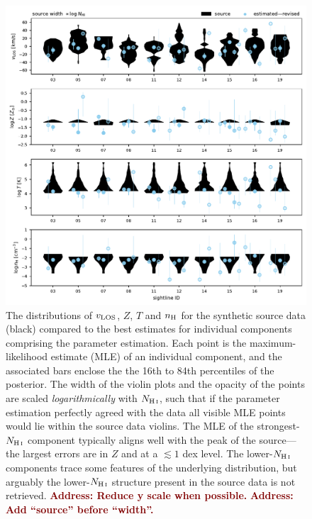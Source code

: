 \documentclass[fleqn,usenatbib]{mnras}
\newcommand{\todo}[1]{\textcolor{Maroon}{\textbf{Address: #1}}}
\begin{document}
\begin{figure}
    \centering
    \includegraphics[width=\textwidth]{figures/sample2/violin_vs_components_revised.pdf}
    \caption{
    The distributions of $v_{\rm LOS}$, $Z$, $T$ and $n_{\rm H}$ for the synthetic source data (black) compared to the best estimates for individual components comprising the parameter estimation.
    Each point is the maximum-likelihood estimate (MLE) of an individual component,
    and the associated bars enclose the the 16th to 84th percentiles of the posterior.
    The width of the violin plots and the opacity of the points are scaled \textit{logarithmically} with $N_{\ion{H}{I}}$,
    such that if the parameter estimation perfectly agreed with the data all visible MLE points would lie within the source data violins.
    The MLE of the strongest-$N_{\ion{H}{I}}$ component typically aligns well with the peak of the source---the largest errors are in $Z$ and at a $\lesssim 1$ dex level.
    The lower-$N_{\ion{H}{I}}$ components trace some features of the underlying distribution,
    but arguably the lower-$N_{\ion{H}{I}}$ structure present in the source data is not retrieved.
    \todo{Reduce y scale when possible.}
    \todo{Add ``source'' before ``width''.}
    }
    \label{f: sample2 violin vs components}
\end{figure}
\end{document}
